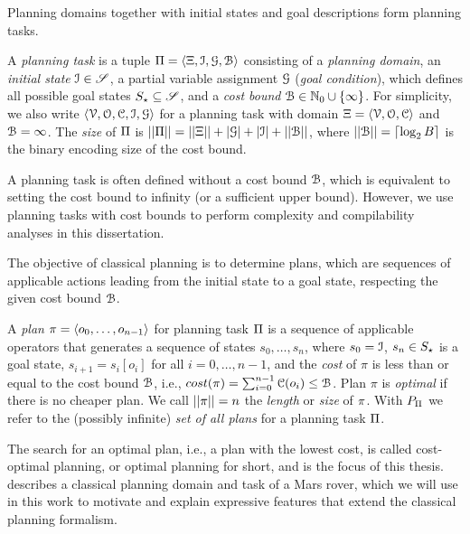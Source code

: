 Planning domains together with initial states and goal descriptions form planning tasks.

\begin{definition}
  \label{def:planning-task}
  A \emph{planning task} is a tuple $\Pi = \langle {\Xi}, \mathcal I, \mathcal G, \mathcal B \rangle$ consisting of a \emph{planning domain}, an \emph{initial state} $\mathcal I \in \mathscr S$, a partial variable assignment $\mathcal G$ (\emph{goal condition}), which defines all possible goal states $S_\star \subseteq \mathscr S$, and a \emph{cost bound} $\mathcal B \in \mathbb{N}_0 \cup \{ \infty \}$. For simplicity, we also write $\langle \mathcal V, \mathcal O, \mathcal C, \mathcal I, \mathcal G \rangle$ for a planning task with domain ${\Xi} = \langle \mathcal V, \mathcal O,\mathcal C \rangle$ and $\mathcal B = \infty$.
  The \emph{size} of $\Pi$ is $||\Pi|| = ||{\Xi}|| + |\mathcal G| + |\mathcal I| + ||\mathcal B||$, where $||\mathcal B|| = \lceil \log_2 B \rceil$ is the binary encoding size of the cost bound.
\end{definition}

A planning task is often defined without a cost bound $\mathcal B$, which is equivalent to setting the cost bound to infinity (or a sufficient upper bound). However, we use planning tasks with cost bounds to perform complexity and compilability analyses in this dissertation.

The objective of classical planning is to determine plans, which are sequences of applicable actions leading from the initial state to a goal state, respecting the given cost bound $\mathcal B$.

\begin{definition}[Plan]
  \label{def:plan}
  A \emph{plan} $\pi = \langle o_0, \dots, o_{n-1} \rangle$ for planning task
  $\Pi$ is a sequence of applicable operators that generates a sequence of
  states $s_0, \dots, s_n$, where  $s_0 = \mathcal I$, $s_n \in S_\star$ is a goal state, $s_{i+1} = s_i[o_i]$ for all $i = 0, \dots, n-1$, and the \emph{cost} of $\pi$ is less than or equal to the cost bound $\mathcal B$, i.e., $cost(\pi) = \sum_{i=0}^{{n-1}} \mathcal C(o_i) \leq \mathcal B$. Plan $\pi$ is \emph{optimal} if
  there is no cheaper plan. We call $||\pi|| = n$ the \emph{length} or \emph{size} of $\pi$. With $P_\Pi$ we refer to the (possibly infinite) \emph{set of all plans} for a planning task $\Pi$.
\end{definition}

The search for an optimal plan, i.e., a plan with the lowest cost, is called cost-optimal planning, or optimal planning for short, and is the focus of this thesis. 
 describes a classical planning domain and task of a Mars rover, which we will use in this work to motivate and explain expressive features that extend the classical planning formalism.

